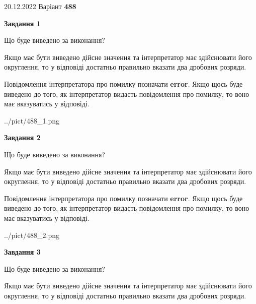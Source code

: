 \documentclass[12pt, ukrainian]{article}
\begin{document}
{20.12.2022 Варіант \No \textbf { 488 }\par}
{
\begin {Large}

{\begin {center}\textbf{Завдання 1}\end {center}}\par
Що буде виведено за виконання? \par

Якщо має бути виведено дійсне значення та інтерпретатор має здійснювати його округлення, 
то у відповіді достатньо правильно вказати два дробових розряди.

Повідомлення інтерпретатора про помилку позначати \textbf{error}.
Якщо щось буде виведено до того, як інтерпретатор видасть повідомлення про помилку, 
то воно має вказуватись у відповіді. \par

\begin{center}
	{../pict/488_1.png}
\end{center}
\newpage

{\begin {center}\textbf{Завдання 2}\end {center}}\par
Що буде виведено за виконання? \par

Якщо має бути виведено дійсне значення та інтерпретатор має здійснювати його округлення, 
то у відповіді достатньо правильно вказати два дробових розряди.

Повідомлення інтерпретатора про помилку позначати \textbf{error}.
Якщо щось буде виведено до того, як інтерпретатор видасть повідомлення про помилку, 
то воно має вказуватись у відповіді. \par

\begin{center}
	{../pict/488_2.png}
\end{center}
\newpage

{\begin {center}\textbf{Завдання 3}\end {center}}\par
Що буде виведено за виконання? \par

Якщо має бути виведено дійсне значення та інтерпретатор має здійснювати його округлення, 
то у відповіді достатньо правильно вказати два дробових розряди.


\end{Large}}
\end{document}
